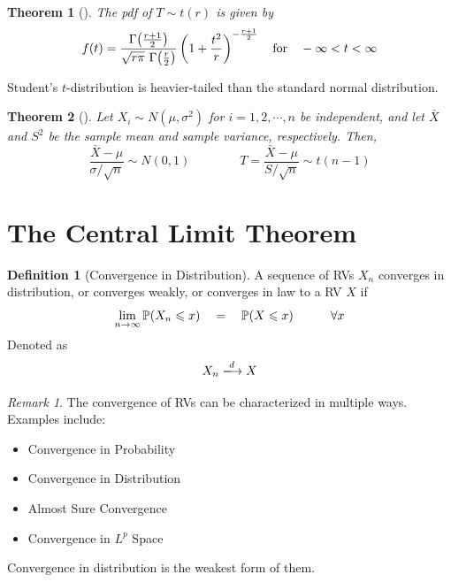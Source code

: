 \documentclass[10pt,UTF8]{article}
\newenvironment{definition box}
{\begin{tcolorbox}[colback=blue!5!white,colframe=blue!75!black,parbox=false,before upper=\par,before lower=\par]}
{\end{tcolorbox}}
\newenvironment{theorem box}
{\begin{tcolorbox}[colback=yellow!5!white,colframe=yellow!75!black,parbox=false,before upper=\par,before lower=\par]}
{\end{tcolorbox}}
\theoremstyle{definition}
\newtheorem{definition inner}{Definition}[section]
\newenvironment{definition}[1][]
{\begin{definition box}\begin{definition inner}[#1]\hfill\par}
{\end{definition inner}\end{definition box}}
\theoremstyle{plain}
\newtheorem{theorem inner}{Theorem}[section]
\newenvironment{theorem}[1][]
{\begin{theorem box}\begin{theorem inner}[#1]\hfill\par}
{\end{theorem inner}\end{theorem box}}
\theoremstyle{definition}
\newtheorem*{proof inner}{\textit{Proof}}
\theoremstyle{remark}
\newtheorem*{remark}{\textit{Remark}}
\newcommand{\Prob}{\mathbb{P}\qty}
\begin{document}
\begin{theorem}
    The pdf of $T\sim t(r)$ is given by
    \begin{equation*}
        f(t) = \frac{
            \Gamma\!\left(\frac{r+1}{2}\right)}{
                \sqrt{r\pi}\ \Gamma\!\left(\frac{r}{2}\right)}
        \left(1+\frac{t^2}{r}\right)^{-\frac{r+1}{2}}
        \qfor -\infty < t < \infty
    \end{equation*}
\end{theorem}

Student's $t$-distribution is heavier-tailed than the standard normal distribution.

\begin{theorem}
    Let $X_i\sim N(\mu,\sigma^2)$ for $i=1,2,\cdots,n$ be independent,
    and let $\bar{X}$ and $S^2$ be the sample mean and sample variance,
    respectively. Then,
    \begin{equation*}
        \frac{\bar{X} - \mu}{\sigma/\sqrt{n}} \sim N(0,1)
        \qquad\qquad
        T = \frac{\bar{X} - \mu}{S/\sqrt{n}} \sim t(n-1)
    \end{equation*}
\end{theorem}


\section{The Central Limit Theorem}

\begin{definition}[Convergence in Distribution]
    A sequence of RVs $X_n$ converges in distribution,
    or converges weakly, or converges in law to a RV $X$ if
    \begin{equation*}
        \lim_{n\to\infty}
        \Prob(X_n \leqslant x)
        \quad=\quad
        \Prob(X \leqslant x)
        \qquad\quad \forall x
    \end{equation*}
    Denoted as
    \begin{equation*}
        X_n \xlongrightarrow{d} X
    \end{equation*}
\end{definition}
\begin{remark}
    The convergence of RVs can be characterized in multiple ways.
    Examples include:
    \begin{itemize}
        \item Convergence in Probability
        \item Convergence in Distribution
        \item Almost Sure Convergence
        \item Convergence in $L^p$ Space
    \end{itemize}
    Convergence in distribution is the weakest form of them.
\end{remark}
\end{document}
